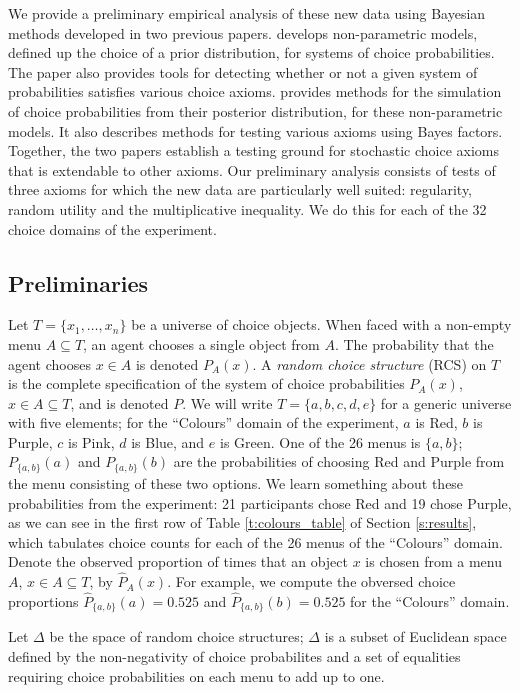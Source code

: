\documentclass[11pt,letter]{article}
\newcommand{\menu}{menu}
\newcommand{\menus}{menus}
\begin{document}
We provide a preliminary empirical analysis of these new data using Bayesian methods developed in two previous papers.
 develops non-parametric models, defined up the choice of a prior distribution, for systems of choice probabilities.
The paper also provides tools for detecting whether or not a given system of probabilities satisfies various choice axioms.
 provides methods for the simulation of choice probabilities from their posterior distribution, for these non-parametric models.
It also describes methods for testing various axioms using Bayes factors.
Together, the two papers establish a testing ground for stochastic choice axioms that is extendable to other axioms.
Our preliminary analysis consists of tests of three axioms for which the new data are particularly well suited: regularity, random utility and the multiplicative inequality.
We do this for each of the 32 choice domains of the experiment.

\subsection{Preliminaries}

Let $T = \{x_1,\ldots,x_n\}$ be a universe of choice objects.
When faced with a non-empty \menu{} $A \subseteq T$, an agent chooses a single object from $A$.
The probability that the agent chooses $x \in A$ is denoted $P_A(x)$.
A {\em random choice structure} (RCS) on $T$ is the complete specification of the system of choice probabilities $P_A(x)$, $x \in A \subseteq T$, and is denoted $P$.
We will write $T = \{a,b,c,d,e\}$ for a generic universe with five elements; for the ``Colours'' domain of the experiment, $a$ is Red, $b$ is Purple, $c$ is Pink, $d$ is Blue, and $e$ is Green.
One of the 26 menus is $\{a,b\}$; $P_{\{a,b\}}(a)$ and $P_{\{a,b\}}(b)$ are the probabilities of choosing Red and Purple from the menu consisting of these two options.
We learn something about these probabilities from the experiment: 21 participants chose Red and 19 chose Purple, as we can see in the first row of Table \ref{t:colours_table} of Section \ref{s:results}, which tabulates choice counts for each of the 26 \menus{} of the ``Colours'' domain.
Denote the observed proportion of times that an object $x$ is chosen from a \menu{} $A$, $x \in A \subseteq T$, by $\hat P_A(x)$.
For example, we compute the obversed choice proportions $\hat P_{\{a,b\}}(a) = 0.525$ and $\hat P_{\{a,b\}}(b) = 0.525$ for the ``Colours'' domain.

Let $\Delta$ be the space of random choice structures; $\Delta$ is a subset of Euclidean space defined by the non-negativity of choice probabilites and a set of equalities requiring choice probabilities on each \menu{} to add up to one.
\end{document}
